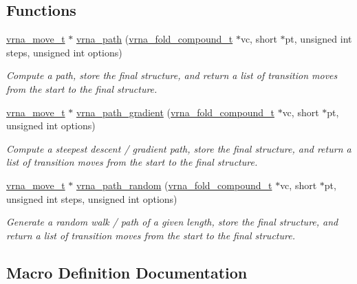 \subsection*{Functions}
\begin{DoxyCompactItemize}
\item 
\mbox{\hyperlink{group__neighbors_ga08630e00206cd163ea29c462bf5f4755}{vrna\+\_\+move\+\_\+t}} $\ast$ \mbox{\hyperlink{group__paths__walk_gaef7afadc36933b80706de49fe36e7b94}{vrna\+\_\+path}} (\mbox{\hyperlink{group__fold__compound_ga1b0cef17fd40466cef5968eaeeff6166}{vrna\+\_\+fold\+\_\+compound\+\_\+t}} $\ast$vc, short $\ast$pt, unsigned int steps, unsigned int options)
\begin{DoxyCompactList}\small\item\em Compute a path, store the final structure, and return a list of transition moves from the start to the final structure. \end{DoxyCompactList}\item 
\mbox{\hyperlink{group__neighbors_ga08630e00206cd163ea29c462bf5f4755}{vrna\+\_\+move\+\_\+t}} $\ast$ \mbox{\hyperlink{group__paths__walk_ga9594d7424dbe301f0dd3f4900db0f05c}{vrna\+\_\+path\+\_\+gradient}} (\mbox{\hyperlink{group__fold__compound_ga1b0cef17fd40466cef5968eaeeff6166}{vrna\+\_\+fold\+\_\+compound\+\_\+t}} $\ast$vc, short $\ast$pt, unsigned int options)
\begin{DoxyCompactList}\small\item\em Compute a steepest descent / gradient path, store the final structure, and return a list of transition moves from the start to the final structure. \end{DoxyCompactList}\item 
\mbox{\hyperlink{group__neighbors_ga08630e00206cd163ea29c462bf5f4755}{vrna\+\_\+move\+\_\+t}} $\ast$ \mbox{\hyperlink{group__paths__walk_ga98fdc3f5cfa36a12738c2ec1ce024570}{vrna\+\_\+path\+\_\+random}} (\mbox{\hyperlink{group__fold__compound_ga1b0cef17fd40466cef5968eaeeff6166}{vrna\+\_\+fold\+\_\+compound\+\_\+t}} $\ast$vc, short $\ast$pt, unsigned int steps, unsigned int options)
\begin{DoxyCompactList}\small\item\em Generate a random walk / path of a given length, store the final structure, and return a list of transition moves from the start to the final structure. \end{DoxyCompactList}\end{DoxyCompactItemize}


\subsection{Macro Definition Documentation}
\mbox{\label{group__paths__walk_ga705cea2b3243a38a2d6e3b1e141ed061}} 
